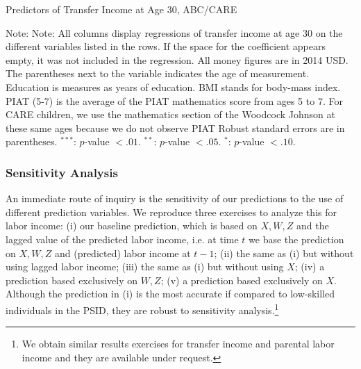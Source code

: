 \begin{table}[H] 
\begin{threeparttable}
\caption{Predictors of Transfer Income at Age 30, ABC/CARE}
\label{table:predabc}
\centering 

\begin{tablenotes}
\footnotesize
\item Note: Note: All columns display regressions of transfer income at age 30 on the different variables listed in the rows. If the space for the coefficient appears empty, it was not included in the regression. All money figures are in 2014 USD. The parentheses next to the variable indicates the age of measurement. Education is measures as years of education. BMI stands for body-mass index. PIAT (5-7) is the average of the PIAT mathematics score from ages 5 to 7. For CARE children, we use the mathematics section of the Woodcock Johnson at these same ages because we do not observe PIAT Robust standard errors are in parentheses. $^{***}$: $p$-value $< .01$. $^{**}$: $p$-value $< .05$. $^{*}$: $p$-value $< .10$.
\end{tablenotes}
\end{threeparttable}
\end{table}

\subsubsection{Sensitivity Analysis}

\noindent An immediate route of inquiry is the sensitivity of our predictions to the use of different prediction variables. We reproduce three exercises to analyze this for labor income: (i) our baseline prediction, which is based on $X,W,Z$ and the lagged value of the predicted labor income, i.e. at time $t$ we base the prediction on $X,W,Z$ and (predicted) labor income at $t-1$; (ii) the same as (i) but without using lagged labor income; (iii) the same as (i) but without using $X$; (iv) a prediction based exclusively on $W,Z$; (v) a prediction based exclusively on $X$.\\

\noindent Although the prediction in (i) is the most accurate if compared to low-skilled individuals in the PSID, they are robust to sensitivity analysis.\footnote{We obtain similar results exercises for transfer income and parental labor income and they are available under request.}

